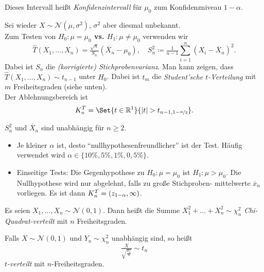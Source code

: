 \documentclass{cheat-sheet}
\newcommand{\testh}[1]{\textcolor{TestColor}{\textbf{#1}}}
\newcommand{\Normal}{\mathcal{N}} %
\begin{document}
\begin{defn}
  Dieses Intervall heißt \emph{Konfidenzintervall} für $\mu_0$ zum Konfidenzniveau $1-\alpha$.
\end{defn}

\begin{test}
  Sei wieder $X \sim \Normal(\mu, \sigma^2)$, $\sigma^2$ aber diesmal unbekannt. \\
  Zum Testen von \testh{$H_0 : \mu = \mu_0$ vs. $H_1 : \mu \neq \mu_0$} verwenden wir
  \[
    \hat{T}(X_1, \ldots, X_n) = \tfrac{\sqrt{n}}{S_n} \left( \overline{X}_n - \mu_0 \right), \quad
    S_n^2 \coloneqq \tfrac{1}{n-1} \sum_{i=1}^n \left( X_i - \overline{X}_n \right)^2.
  \]
  Dabei ist $S_n$ die \emph{(korrigierte) Stichprobenvarianz}.
  Man kann zeigen, dass $\hat{T}(X_1, \ldots, X_n) \sim t_{n-1}$ unter $H_0$.
  Dabei ist $t_m$ die \emph{Student'sche $t$-Verteilung} mit $m$ Freiheitsgraden (siehe unten). \\
  Der Ablehnungsbereich ist
  \[ K_n^T = \Set{t \in \R^1}{\abs{t} > t_{n-1,1-\nicefrac{\alpha}{2}}}. \]
\end{test}

\begin{bem}
  $S_n^2$ und $\overline{X}_n$ sind unabhängig für $n \geq 2$. %
\end{bem}

\begin{diskussion}
  \begin{itemize}
    \item Je kleiner $\alpha$ ist, desto "`nullhypothesenfreundlicher"' ist der Test.
    Häufig verwendet wird $\alpha \in \{ 10\%, 5\%, 1\%, 0,5\% \}$.
    \item Einseitige Tests: Die Gegenhypothese zu $H_0 \!:\! \mu \!=\! \mu_0$ ist $H_1 \!:\! \mu \!>\! \mu_0$.
    Die Nullhypothese wird nur abgelehnt, falls zu große Stichproben- mittelwerte $\overline{x}_n$ vorliegen. Es ist dann $K_n^T = \left( z_{1-\alpha}, \infty \right)$.
  \end{itemize}
\end{diskussion}


\begin{defn}
  Es seien $X_1, \ldots, X_n \sim \Normal(0, 1)$.
  Dann heißt die Summe $X_1^2 + \ldots + X_n^2 \sim \chi_n^2$ \emph{Chi-Quadrat-verteilt} mit $n$ Freiheitsgraden.
\end{defn}

\begin{defn}
  Falls $X \sim \Normal(0,1)$ und $Y_n \sim \chi_n^2$ unabhängig sind, so heißt
  \[ \tfrac{X}{\sqrt{\tfrac{Y_n}{n}}} \sim t_n \]
  \emph{$t$-verteilt} mit $n$-Freiheitsgraden.
\end{defn}
\end{document}

